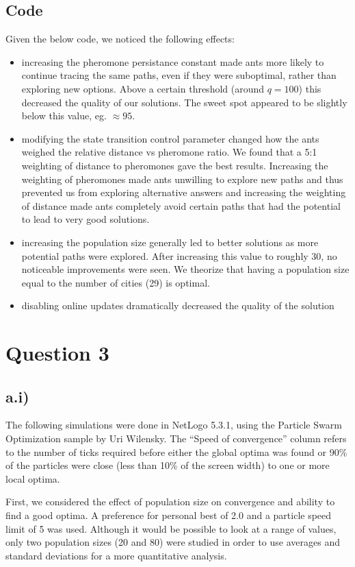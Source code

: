 \documentclass[12pt]{article}
\begin{document}
\subsection*{Code}
Given the below code, we noticed the following effects:
\begin{itemize}
\item increasing the pheromone persistance constant made ants more likely to continue tracing the same paths, even if they were suboptimal, rather than exploring new options. Above a certain threshold (around $q=100$) this decreased the quality of our solutions. The sweet spot appeared to be slightly below this value, eg. $\approx 95$.
\item modifying the state transition control parameter changed how the ants weighed the relative distance vs pheromone ratio. We found that a 5:1 weighting of distance to pheromones gave the best results. Increasing the weighting of pheromones made ants unwilling to explore new paths and thus prevented us from exploring alternative answers and increasing the weighting of distance made ants completely avoid certain paths that had the potential to lead to very good solutions.
\item increasing the population size generally led to better solutions as more potential paths were explored. After increasing this value to roughly 30, no noticeable improvements were seen. We theorize that having a population size equal to the number of cities (29) is optimal.
\item disabling online updates dramatically decreased the quality of the solution
\end{itemize}



\section*{Question 3}
\subsection*{a.i)}

The following simulations were done in NetLogo 5.3.1, using the Particle Swarm Optimization sample by Uri Wilensky. The ``Speed of convergence'' column refers to the number of ticks required before either the global optima was found or 90\% of the particles were close (less than 10\% of the screen width) to one or more local optima.

First, we considered the effect of population size on convergence and ability to find a good optima. A preference for personal best of 2.0 and a particle speed limit of 5 was used. Although it would be possible to look at a range of values, only two population sizes (20 and 80) were studied in order to use averages and standard deviations for a more quantitative analysis.
\end{document}

